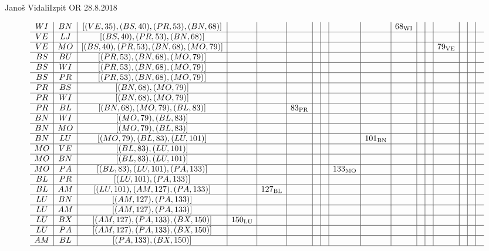 \begin{naloga}{Janoš Vidali}{Izpit OR 28.8.2018}
\begin{odgovor}
\begin{tabela}
\begin{small}
$$\begin{array}{c|c|c|c|c|c|c|c|c|c|c|c|c|c|c|c|c}
WI & BN & [(VE, 35), (BS, 40), (PR, 53), (BN, 68)] & & & & & & & & 68_{\text{WI}} & & & & & & \\ \hline
VE & LJ & [(BS, 40), (PR, 53), (BN, 68)] & & & & & & & & & & & & & & \\ \hline
VE & MO & [(BS, 40), (PR, 53), (BN, 68), (MO, 79)] & & & & & & & & & & & 79_{\text{VE}} & & & \\ \hline
BS & BU & [(PR, 53), (BN, 68), (MO, 79)] & & & & & & & & & & & & & & \\ \hline
BS & WI & [(PR, 53), (BN, 68), (MO, 79)] & & & & & & & & & & & & & & \\ \hline
BS & PR & [(PR, 53), (BN, 68), (MO, 79)] & & & & & & & & & & & & & & \\ \hline
PR & BS & [(BN, 68), (MO, 79)] & & & & & & & & & & & & & & \\ \hline
PR & WI & [(BN, 68), (MO, 79)] & & & & & & & & & & & & & & \\ \hline
PR & BL & [(BN, 68), (MO, 79), (BL, 83)] & & & 83_{\text{PR}} & & & & & & & & & & & \\ \hline
BN & WI & [(MO, 79), (BL, 83)] & & & & & & & & & & & & & & \\ \hline
BN & MO & [(MO, 79), (BL, 83)] & & & & & & & & & & & & & & \\ \hline
BN & LU & [(MO, 79), (BL, 83), (LU, 101)] & & & & & & & 101_{\text{BN}} & & & & & & & \\ \hline
MO & VE & [(BL, 83), (LU, 101)] & & & & & & & & & & & & & & \\ \hline
MO & BN & [(BL, 83), (LU, 101)] & & & & & & & & & & & & & & \\ \hline
MO & PA & [(BL, 83), (LU, 101), (PA, 133)] & & & & & & 133_{\text{MO}} & & & & & & & & \\ \hline
BL & PR & [(LU, 101), (PA, 133)] & & & & & & & & & & & & & & \\ \hline
BL & AM & [(LU, 101), (AM, 127), (PA, 133)] & & 127_{\text{BL}} & & & & & & & & & & & & \\ \hline
LU & BN & [(AM, 127), (PA, 133)] & & & & & & & & & & & & & & \\ \hline
LU & AM & [(AM, 127), (PA, 133)] & & & & & & & & & & & & & & \\ \hline
LU & BX & [(AM, 127), (PA, 133), (BX, 150)] & 150_{\text{LU}} & & & & & & & & & & & & & \\ \hline
LU & PA & [(AM, 127), (PA, 133), (BX, 150)] &  & & & & & & & & & & & & & \\ \hline
AM & BL & [(PA, 133), (BX, 150)] &  & & & & & & & & & & & & & \\ \hline

\end{array}$$
\end{small}
\end{tabela}
\end{odgovor}
\end{naloga}
